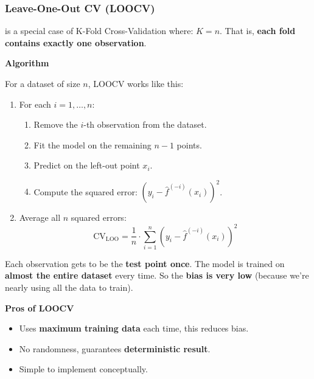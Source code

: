 \subsubsection{Leave-One-Out CV (LOOCV)}\label{subsubsection: Leave-One-Out CV - LOOCV}

 is a special case of K-Fold Cross-Validation where: $K = n$. That is, \textbf{each fold contains exactly one observation}.

\highspace
\begin{flushleft}
    \textcolor{Green3}{ \textbf{Algorithm}}
\end{flushleft}
For a dataset of size $n$, LOOCV works like this:
\begin{enumerate}
    \item For each $i = 1, \dots, n$:
    \begin{enumerate}
        \item Remove the $i$-th observation from the dataset.
        \item Fit the model on the remaining $n-1$ points.
        \item Predict on the left-out point $x_i$.
        \item Compute the squared error: $\left(y_i - \hat{f}^{(-i)}(x_i)\right)^2$.
    \end{enumerate}
    \item Average all $n$ squared errors:
    \begin{equation}
        \text{CV}_{\text{LOO}} = \dfrac{1}{n} \cdot \sum_{i=1}^n \left(y_i - \hat{f}^{(-i)}(x_i)\right)^2
    \end{equation}
\end{enumerate}
Each observation gets to be the \textbf{test point once}. The model is trained on \textbf{almost the entire dataset} every time. So the \textbf{bias is very low} (because we're nearly using all the data to train).

\highspace
\begin{flushleft}
    \textcolor{Green3}{ \textbf{Pros of LOOCV}}
\end{flushleft}
\begin{itemize}
    \item Uses \textbf{maximum training data} each time, this reduces bias.
    \item No randomness, guarantees \textbf{deterministic result}.
    \item Simple to implement conceptually.
\end{itemize}

